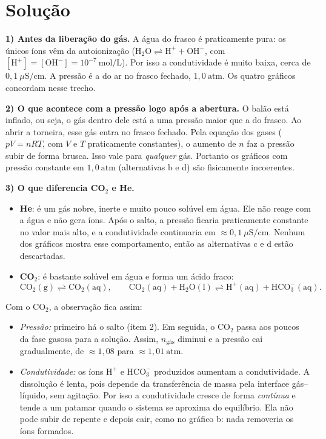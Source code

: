 \documentclass{article}%
\begin{document}
\section*{Solução}

\textbf{1) Antes da liberação do gás.} A água do frasco é praticamente pura: os únicos íons vêm da autoionização ($\mathrm{H_2O \rightleftharpoons H^+ + OH^-}$, com $[\mathrm{H^+}]=[\mathrm{OH^-}]=10^{-7}\ \mathrm{mol/L}$). Por isso a condutividade é muito baixa, cerca de $0{,}1\ \mu\mathrm{S/cm}$. A pressão é a do ar no frasco fechado, $1{,}0\ \mathrm{atm}$. Os quatro gráficos concordam nesse trecho.

\textbf{2) O que acontece com a pressão logo após a abertura.} O balão está inflado, ou seja, o gás dentro dele está a uma pressão maior que a do frasco. Ao abrir a torneira, esse gás entra no frasco fechado. Pela equação dos gases ($pV=nRT$, com $V$ e $T$ praticamente constantes), o aumento de $n$ faz a pressão subir de forma brusca. Isso vale para \emph{qualquer} gás. Portanto os gráficos com pressão constante em $1{,}0\ \mathrm{atm}$ (alternativas b e d) são fisicamente incoerentes.

\textbf{3) O que diferencia CO$_2$ e He.}
\begin{itemize}
\item \textbf{He}: é um gás nobre, inerte e muito pouco solúvel em água. Ele não reage com a água e não gera íons. Após o salto, a pressão ficaria praticamente constante no valor mais alto, e a condutividade continuaria em $\approx 0{,}1\ \mu\mathrm{S/cm}$. Nenhum dos gráficos mostra esse comportamento, então as alternativas c e d estão descartadas.
\item \textbf{CO$_2$}: é bastante solúvel em água e forma um ácido fraco:
\[
\mathrm{CO_2(g) \rightleftharpoons CO_2(aq)}, \qquad
\mathrm{CO_2(aq) + H_2O(l) \rightleftharpoons H^+(aq) + HCO_3^-(aq)}.
\]
\end{itemize}
Com o CO$_2$, a observação fica assim:
\begin{itemize}
\item \emph{Pressão:} primeiro há o salto (item 2). Em seguida, o CO$_2$ passa aos poucos da fase gasosa para a solução. Assim, $n_{\text{gás}}$ diminui e a pressão cai gradualmente, de $\approx 1{,}08$ para $\approx 1{,}01\ \mathrm{atm}$.
\item \emph{Condutividade:} os íons $\mathrm{H^+}$ e $\mathrm{HCO_3^-}$ produzidos aumentam a condutividade. A dissolução é lenta, pois depende da transferência de massa pela interface gás--líquido, sem agitação. Por isso a condutividade cresce de forma \emph{contínua} e tende a um patamar quando o sistema se aproxima do equilíbrio. Ela não pode subir de repente e depois cair, como no gráfico b: nada removeria os íons formados.
\end{itemize}
\end{document}
